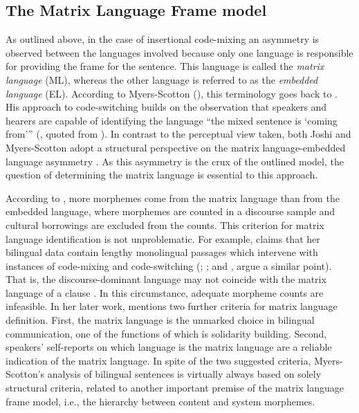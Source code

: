 \subsection {The Matrix Language Frame model}
As outlined above, in the case of insertional code-mixing an asymmetry is observed between the languages involved because only one language is responsible for providing the frame for the sentence. This language is called the \textit{matrix language} (ML), whereas the other language is referred to as the \textit{embedded language} (EL). According to Myers-Scotton (\citeyear{myers-scotton-duelling-1993}), this terminology goes back to \citet{joshi85}. His approach to code-switching builds on the observation that speakers and hearers are capable of identifying the language ``the mixed sentence is `coming from''' (\citealt{joshi85}, quoted from \citealt[35]{myers-scotton-duelling-1993}). In contrast to the perceptual view taken, both Joshi and Myers-Scotton adopt a structural perspective on the matrix language-embedded language asymmetry \citep[cf.][35--37]{myers-scotton-duelling-1993}. As this asymmetry is the crux of the outlined model, the question of determining the matrix language is essential to this approach. 

According to \citet[68]{myers-scotton-duelling-1993}, more morphemes come from the matrix language than from the embedded language, where morphemes are counted in a discourse sample and cultural borrowings are excluded from the counts. This criterion for matrix language identification is not unproblematic. For example, \citet[19]{muhamedowa-untersuchung-2006} claims that her bilingual data contain lengthy monolingual passages which intervene with instances of code-mixing and code-switching (\citealt[102]{haust-codeswitching-1995}; \citealt[154]{boumans-syntax-1998}; and \citealt[196]{hlavac-second-generation-2003}, argue a similar point). That is, the discourse-dominant language may not coincide with the matrix language of a clause \citep[cf.][]{heller-conversation-1988}. In this circumstance, adequate morpheme counts are infeasible. In her later work, \citet[237]{milroy-lexically-1995} mentions two further criteria for matrix language definition. First, the matrix language is the unmarked choice in bilingual communication, one of the functions of which is solidarity building. Second, speakers' self-reports on which language is the matrix language are a reliable indication of the matrix language. In spite of the two suggested criteria, Myers-Scotton's analysis of bilingual sentences is virtually always based on solely structural criteria, related to another important premise of the matrix language frame model, i.e., the hierarchy between content and system morphemes.

